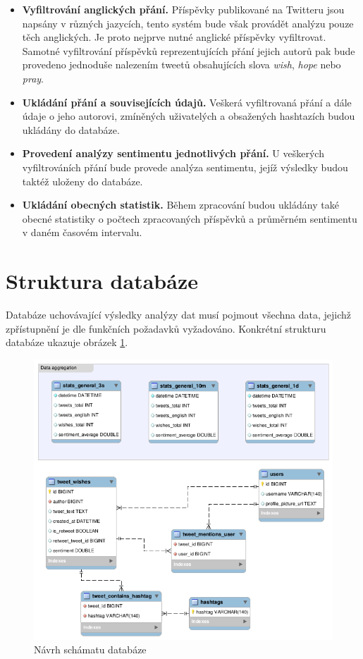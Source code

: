 \documentclass[thesis=B,czech]{FITthesis}[2012/06/26]
\begin{document}
\begin{itemize}
\item \textbf{Vyfiltrování anglických přání.} Příspěvky publikované na Twitteru jsou napsány v různých jazycích, tento systém bude však provádět analýzu pouze těch anglických. Je proto nejprve nutné anglické příspěvky vyfiltrovat. Samotné vyfiltrování příspěvků reprezentujících přání jejich autorů pak bude provedeno jednoduše nalezením tweetů obsahujících slova \textit{wish}, \textit{hope} nebo \textit{pray}. 
\item \textbf{Ukládání přání a souvisejících údajů.} Veškerá vyfiltrovaná přání a dále údaje o jeho autorovi, zmíněných uživatelých a obsažených hashtazích budou ukládány do databáze. 
\item \textbf{Provedení analýzy sentimentu jednotlivých přání.} U veškerých vyfiltrováních přání bude provede analýza sentimentu, jejíž výsledky budou taktéž uloženy do databáze. 
\item \textbf{Ukládání obecných statistik.} Během zpracování budou ukládány také obecné statistiky o počtech zpracovaných příspěvků a průměrném sentimentu v daném časovém intervalu. 
\end{itemize}

\section{Struktura databáze}
Databáze uchovávající výsledky analýzy dat musí pojmout všechna data, jejichž zpřístupnění je dle funkčních požadavků vyžadováno. Konkrétní strukturu databáze ukazuje obrázek \ref{fig:db-structure}. 

\begin{figure}[ht]
   	\centering
   	\includegraphics[width=1\textwidth]{../db_model.png}
   	\caption{Návrh schámatu databáze}
   	\label{fig:db-structure}
\end{figure}
\end{document}
